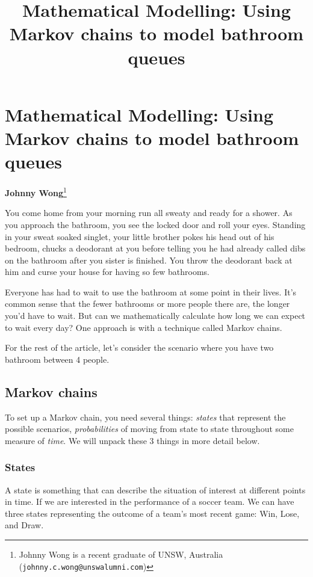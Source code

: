 \usetikzlibrary{automata, positioning}

\section*{Mathematical Modelling: Using Markov chains to model bathroom queues}
\vspace{-.30cm}

\title{Mathematical Modelling: Using Markov chains to model bathroom queues}

\begin{center}
	\textbf{Johnny Wong}\footnote{%
		Johnny Wong is a recent graduate of UNSW, Australia ({\tt johnny.c.wong@unswalumni.com})}
\end{center}

\vspace{5mm}

You come home from your morning run all sweaty and ready for a shower. As you approach the bathroom, you see the locked door and roll your eyes. Standing in your sweat soaked singlet, your little brother pokes his head out of his bedroom, chucks a deodorant at you before telling you he had already called dibs on the bathroom after you sister is finished. You throw the deodorant back at him and curse your house for having so few bathrooms.

Everyone has had to wait to use the bathroom at some point in their lives. It's common sense that the fewer bathrooms or more people there are, the longer you'd have to wait. But can we mathematically calculate how long we can expect to wait every day? One approach is with a technique called Markov chains.

For the rest of the article, let's consider the scenario where you have two bathroom between 4 people.

\subsection*{Markov chains}
To set up a Markov chain, you need several things: \textit{states} that represent the possible scenarios, \textit{probabilities} of moving from state to state throughout some measure of \textit{time}. We will unpack these 3 things in more detail below.

\subsubsection*{States}
A state is something that can describe the situation of interest at different points in time. If we are interested in the performance of a soccer team. We can have three states representing the outcome of a team's most recent game: Win, Lose, and Draw.

